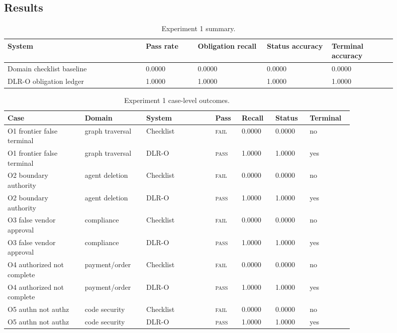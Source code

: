 \documentclass[11pt]{article}
\newcommand{\pass}{\textsc{pass}}
\newcommand{\fail}{\textsc{fail}}
\begin{document}
\subsection{Results}

\begin{table}[h]
\centering
\caption{Experiment 1 summary.}
\label{tab:o_summary}
\small
\setlength{\tabcolsep}{2pt}
\begin{tabular}{L{0.32\linewidth}C{0.12\linewidth}C{0.16\linewidth}C{0.15\linewidth}C{0.15\linewidth}}
\toprule
System & Pass rate & Obligation recall & Status accuracy & Terminal accuracy \\
\midrule
Domain checklist baseline & 0.0000 & 0.0000 & 0.0000 & 0.0000 \\
DLR-O obligation ledger & 1.0000 & 1.0000 & 1.0000 & 1.0000 \\
\bottomrule
\end{tabular}
\end{table}

\begin{table}[h]
\centering
\caption{Experiment 1 case-level outcomes.}
\label{tab:o_case_scores}
\scriptsize
\setlength{\tabcolsep}{2pt}
\begin{tabular}{L{0.19\linewidth}L{0.14\linewidth}L{0.17\linewidth}C{0.06\linewidth}C{0.08\linewidth}C{0.08\linewidth}C{0.08\linewidth}}
\toprule
Case & Domain & System & Pass & Recall & Status & Terminal \\
\midrule
O1 frontier false terminal & graph traversal & Checklist & \fail & 0.0000 & 0.0000 & no \\
O1 frontier false terminal & graph traversal & DLR-O & \pass & 1.0000 & 1.0000 & yes \\
O2 boundary authority & agent deletion & Checklist & \fail & 0.0000 & 0.0000 & no \\
O2 boundary authority & agent deletion & DLR-O & \pass & 1.0000 & 1.0000 & yes \\
O3 false vendor approval & compliance & Checklist & \fail & 0.0000 & 0.0000 & no \\
O3 false vendor approval & compliance & DLR-O & \pass & 1.0000 & 1.0000 & yes \\
O4 authorized not complete & payment/order & Checklist & \fail & 0.0000 & 0.0000 & no \\
O4 authorized not complete & payment/order & DLR-O & \pass & 1.0000 & 1.0000 & yes \\
O5 authn not authz & code security & Checklist & \fail & 0.0000 & 0.0000 & no \\
O5 authn not authz & code security & DLR-O & \pass & 1.0000 & 1.0000 & yes \\
\bottomrule
\end{tabular}
\end{table}
\end{document}

